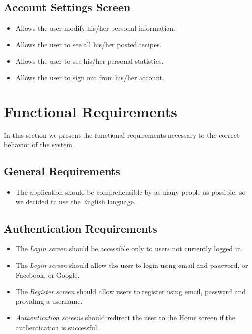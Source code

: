 	\subsection{Account Settings Screen}
		\begin{itemize}
			\item Allows the user modify his/her personal information.
			
			\item Allows the user to see all his/her posted recipes.
			
			\item Allows the user to see his/her personal statistics.
			
			\item Allows the user to sign out from his/her account.
		\end{itemize}


\section{Functional Requirements}
	In this section we present the functional requirements necessary to the correct behavior of the system.

	\subsection{General Requirements}
		\begin{itemize}
			\item The application should be comprehensible by as many people as possible, so we decided to use the English language.
		\end{itemize}

	\subsection{Authentication Requirements}
		\begin{itemize}
			\item The \textit{Login screen} should be accessible only to users not currently logged in.
			\item The \textit{Login screen} should allow the user to login using email and password, or Facebook, or Google.
			\item The \textit{Register screen} should allow users to register using email, password and providing a username. 
			\item \textit{Authentication screens} should redirect the user to the Home screen if the authentication is successful.
		\end{itemize}

